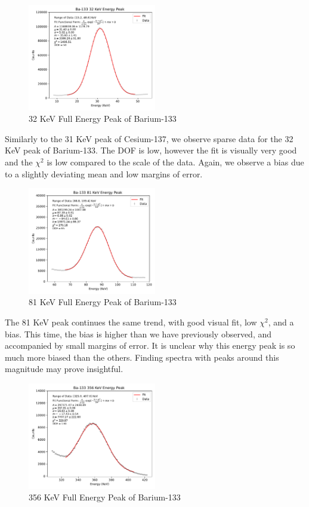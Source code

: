 \documentclass[12pt, letterpaper]{article}
\begin{document}
\begin{figure}[h]
    \centering
    \includegraphics[width=0.5\textwidth]{experiment1/figures/ba133/peak-32.pdf}
    \caption{32 KeV Full Energy Peak of Barium-133}
    \label{fig:ba133-32}
\end{figure}

Similarly to the 31 KeV peak of Cesium-137, we observe sparse data for the 32 KeV peak of Barium-133. The DOF is low, however the fit is visually very good and the $\chi^2$ is low compared to the scale of the data. Again, we observe a bias due to a slightly deviating mean and low margins of error. 

\begin{figure}[h]
    \centering
    \includegraphics[width=0.5\textwidth]{experiment1/figures/ba133/peak-81.pdf}
    \caption{81 KeV Full Energy Peak of Barium-133}
    \label{fig:ba133-81}
\end{figure}

The 81 KeV peak continues the same trend, with good visual fit, low $\chi^2$, and a bias. This time, the bias is higher than we have previously observed, and accompanied by small margins of error. It is unclear why this energy peak is so much more biased than the others. Finding spectra with peaks around this magnitude may prove insightful. 

\begin{figure}[h]
    \centering
    \includegraphics[width=0.5\textwidth]{experiment1/figures/ba133/peak-356.pdf}
    \caption{356 KeV Full Energy Peak of Barium-133}
    \label{fig:ba133-356}
\end{figure}
\end{document}

